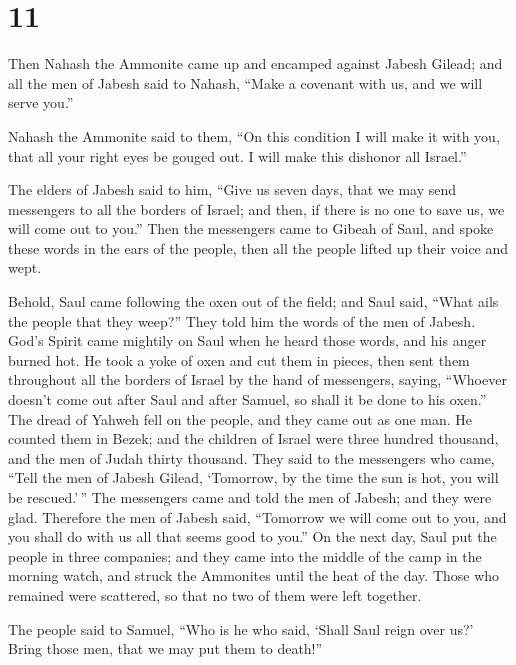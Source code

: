 \hypertarget{section-10}{%
\section{11}\label{section-10}}

 Then Nahash the Ammonite came up and encamped against
Jabesh Gilead; and all the men of Jabesh said to Nahash, ``Make a
covenant with us, and we will serve you.''

 Nahash the Ammonite said to them, ``On this condition I
will make it with you, that all your right eyes be gouged out. I will
make this dishonor all Israel.''

 The elders of Jabesh said to him, ``Give us seven days,
that we may send messengers to all the borders of Israel; and then, if
there is no one to save us, we will come out to you.''  Then
the messengers came to Gibeah of Saul, and spoke these words in the ears
of the people, then all the people lifted up their voice and wept.

 Behold, Saul came following the oxen out of the field; and
Saul said, ``What ails the people that they weep?'' They told him the
words of the men of Jabesh.  God's Spirit came mightily on
Saul when he heard those words, and his anger burned hot. 
He took a yoke of oxen and cut them in pieces, then sent them throughout
all the borders of Israel by the hand of messengers, saying, ``Whoever
doesn't come out after Saul and after Samuel, so shall it be done to his
oxen.'' The dread of Yahweh fell on the people, and they came out as one
man.  He counted them in Bezek; and the children of Israel
were three hundred thousand, and the men of Judah thirty thousand.
 They said to the messengers who came, ``Tell the men of
Jabesh Gilead, `Tomorrow, by the time the sun is hot, you will be
rescued.'\,'' The messengers came and told the men of Jabesh; and they
were glad.  Therefore the men of Jabesh said, ``Tomorrow we
will come out to you, and you shall do with us all that seems good to
you.''  On the next day, Saul put the people in three
companies; and they came into the middle of the camp in the morning
watch, and struck the Ammonites until the heat of the day. Those who
remained were scattered, so that no two of them were left together.

 The people said to Samuel, ``Who is he who said, `Shall
Saul reign over us?' Bring those men, that we may put them to death!''

